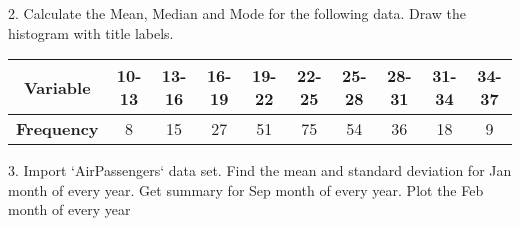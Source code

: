 \documentclass{article}\usepackage[]{graphicx}\usepackage[]{xcolor}
\begin{document}
2. Calculate the Mean, Median and Mode for the following data. Draw the histogram with title labels.
\begin{table}[!ht]
    \centering
    \begin{tabular}{|c|c|c|c|c|c|c|c|c|c|}
    \hline
        \textbf{Variable} & 10-13 & 13-16 & 16-19 & 19-22 & 22-25 & 25-28 & 28-31 & 31-34 & 34-37 \\ \hline
        \textbf{Frequency} & 8 & 15 & 27 & 51 & 75 & 54 & 36 & 18 & 9 \\ \hline
    \end{tabular}
\end{table}


3. Import `AirPassengers` data set. 
Find the mean and standard deviation for Jan month of every year.
 Get summary for  Sep month of every year.
 Plot the Feb month of every year
\end{document}
